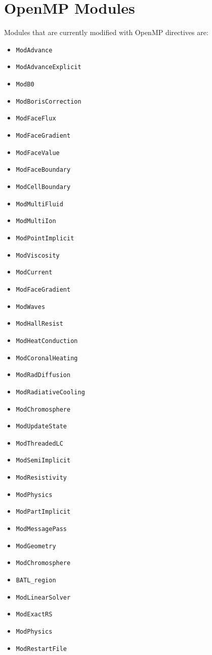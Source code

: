 \documentclass[11pt]{book} %
\begin{document}
\section{OpenMP Modules}
Modules that are currently modified with OpenMP directives are:
\begin{itemize}
\item \verb|ModAdvance|
\item \verb|ModAdvanceExplicit|
\item \verb|ModB0|
\item \verb|ModBorisCorrection|
\item \verb|ModFaceFlux|
\item \verb|ModFaceGradient|
\item \verb|ModFaceValue|
\item \verb|ModFaceBoundary|
\item \verb|ModCellBoundary|
\item \verb|ModMultiFluid|
\item \verb|ModMultiIon|
\item \verb|ModPointImplicit|
\item \verb|ModViscosity|
\item \verb|ModCurrent|
\item \verb|ModFaceGradient|
\item \verb|ModWaves|
\item \verb|ModHallResist|
\item \verb|ModHeatConduction|
\item \verb|ModCoronalHeating|
\item \verb|ModRadDiffusion|
\item \verb|ModRadiativeCooling|
\item \verb|ModChromosphere|
\item \verb|ModUpdateState|
\item \verb|ModThreadedLC|
\item \verb|ModSemiImplicit|
\item \verb|ModResistivity|
\item \verb|ModPhysics|
\item \verb|ModPartImplicit|
\item \verb|ModMessagePass|
\item \verb|ModGeometry|
\item \verb|ModChromosphere|
\item \verb|BATL_region|
\item \verb|ModLinearSolver|
\item \verb|ModExactRS|
\item \verb|ModPhysics|
\item \verb|ModRestartFile|

\end{itemize}
\end{document}
